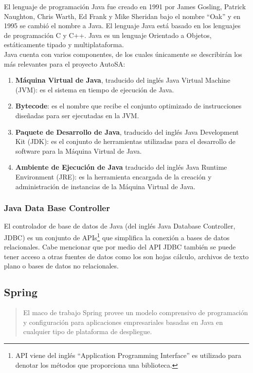 El lenguaje de programación Java fue creado en 1991 por James Gosling, Patrick Naughton, Chris Warth, Ed Frank y Mike Sheridan bajo el nombre ``Oak'' y en 1995 se cambió el nombre a Java. El lenguaje Java está basado en los lenguajes de programación C y C++. Java es un lenguaje Orientado a Objetos, estáticamente tipado y multiplataforma\cite{JavaCompleteReference, WellGroundedJavaDeveloper}.\\
Java cuenta con varios componentes, de los cuales únicamente se describirán los más relevantes para el proyecto AutoSA\cite{JavaCompleteReference, WellGroundedJavaDeveloper}:
\begin{enumerate}
	\item \textbf{Máquina Virtual de Java}, traducido del inglés Java Virtual Machine (JVM): es el sistema en tiempo de ejecución de Java.
	\item \textbf{Bytecode}: es el nombre que recibe el conjunto optimizado de instrucciones diseñadas para ser ejecutadas en la JVM.
	\item \textbf{Paquete de Desarrollo de Java}, traducido del inglés Java Development Kit (JDK): es el conjunto de herramientas utilizadas para el desarrollo de software para la Máquina Virtual de Java.
	\item \textbf{Ambiente de Ejecución de Java} traducido del inglés Java Runtime Environment (JRE): es la herramienta encargada de la creación y administración de instancias de la Máquina Virtual de Java.
\end{enumerate}

\subsubsection{Java Data Base Controller}\label{sec:jdbc}
El controlador de base de datos de Java (del inglés Java Database Controller, JDBC) es un conjunto de APIs\footnote{API viene del inglés ``Application Programming Interface'' es utilizado para denotar los métodos que proporciona una biblioteca.} que simplifica la conexión a bases de datos relacionales. Cabe mencionar que por medio del API JDBC también se puede tener acceso a otras fuentes de datos como los son hojas cálculo, archivos de texto plano o bases de datos no relacionales\cite{JDBCRecipes, BeginingJava8APIs}.

\subsection{Spring}\label{sec:spring}
\begin{quote}
	El maco de trabajo Spring provee un modelo comprensivo de programación y configuración para aplicaciones empresariales basadas en Java en cualquier tipo de plataforma de despliegue\cite{SpringFramework}.
\end{quote}

